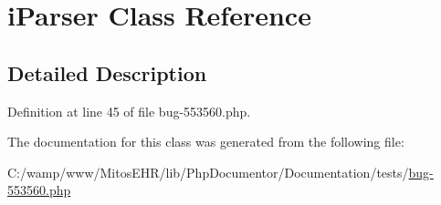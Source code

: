 \hypertarget{classi_parser}{\section{i\-Parser \-Class \-Reference}
\label{classi_parser}
}


\subsection{\-Detailed \-Description}


\-Definition at line 45 of file bug-\/553560.\-php.



\-The documentation for this class was generated from the following file\-:\begin{DoxyCompactItemize}
\item 
\-C\-:/wamp/www/\-Mitos\-E\-H\-R/lib/\-Php\-Documentor/\-Documentation/tests/\hyperlink{bug-553560_8php}{bug-\/553560.\-php}\end{DoxyCompactItemize}
